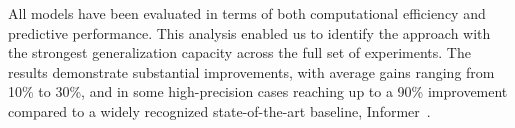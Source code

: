 All models have been evaluated in terms of both computational efficiency and predictive performance. This analysis enabled us to identify the approach with the strongest generalization capacity across the full set of experiments. The results demonstrate substantial improvements, with average gains ranging from 10\% to 30\%, and in some high-precision cases reaching up to a 90\% improvement compared to a widely recognized state-of-the-art baseline, Informer~\cite{zhou2021informerefficienttransformerlong}.
\endinput

